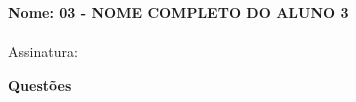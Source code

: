 \documentclass[addpoints,,12pt]{exam}
\begin{document}
	\begin{mdframed}[align=left]
		\textbf{Nome: 03 - NOME COMPLETO DO ALUNO 3}
		\\
		\\Assinatura:
	\end{mdframed}

	\newpage	
	
\noindent \textbf{Questões}

\begin{questions}










\end{questions}
\end{document}
